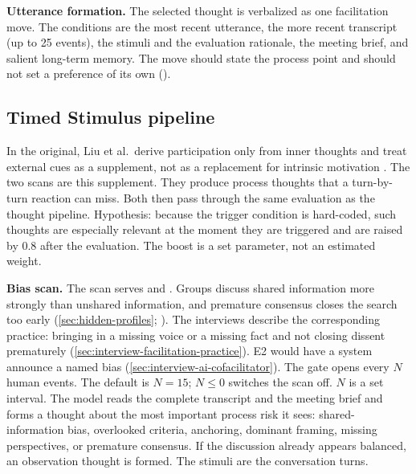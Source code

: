 \textbf{Utterance formation.}
The selected thought is verbalized as one facilitation move.
The conditions are the most recent utterance, the more recent transcript (up to 25 events), the stimuli and the
evaluation rationale, the meeting brief, and salient long-term memory.
The move should state the process point and should not set a preference of its own
().

\subsection{Timed Stimulus pipeline}

In the original, Liu et al.\ derive participation only from inner thoughts and treat external cues as a
supplement, not as a replacement for intrinsic motivation
\cite[8.1]{liuProactiveConversationalAgents2025}.
The two scans are this supplement.
They produce process thoughts that a turn-by-turn reaction can miss.
Both then pass through the same evaluation as the thought pipeline.
Hypothesis: because the trigger condition is hard-coded, such thoughts are especially relevant at the moment
they are triggered and are raised by \(0.8\) after the evaluation.
The boost is a set parameter, not an estimated weight.

\textbf{Bias scan.}
The scan serves  and .
Groups discuss shared information more strongly than unshared information, and premature consensus closes the
search too early
(\autoref{sec:hidden-profiles}; \cite{schulz-hardtGroupDecisionMaking2006}).
The interviews describe the corresponding practice: bringing in a missing voice or a missing fact
and not closing dissent prematurely
(\autoref{sec:interview-facilitation-practice}).
E2 would have a system announce a named bias
(\autoref{sec:interview-ai-cofacilitator}).
The gate opens every \(N\) human events.
The default is \(N = 15\); \(N \le 0\) switches the scan off.
\(N\) is a set interval.
The model reads the complete transcript and the meeting brief and forms a thought about the most important
process risk it sees: shared-information bias, overlooked criteria, anchoring, dominant framing,
missing perspectives, or premature consensus.
If the discussion already appears balanced, an observation thought is formed.
The stimuli are the conversation turns.

